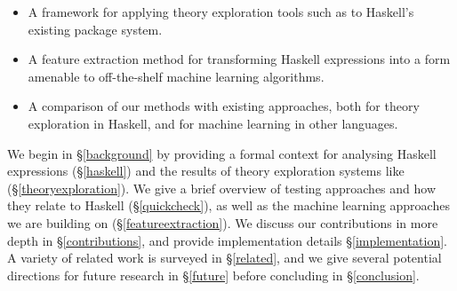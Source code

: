 \begin{itemize}
  \item A framework for applying theory exploration tools such as \qspec{} to Haskell's existing package system.
  \item A feature extraction method for transforming Haskell expressions into a form amenable to off-the-shelf machine learning algorithms.
  \item A comparison of our methods with existing approaches, both for theory exploration in Haskell, and for machine learning in other languages.
\end{itemize}

We begin in \S \ref{background} by providing a formal context for analysing Haskell expressions (\S \ref{haskell}) and the results of theory exploration systems like \qspec{} (\S \ref{theoryexploration}). We give a brief overview of testing approaches and how they relate to Haskell (\S \ref{quickcheck}), as well as the machine learning approaches we are building on (\S \ref{featureextraction}). We discuss our contributions in more depth in \S \ref{contributions}, and provide implementation details \S \ref{implementation}. A variety of related work is surveyed in \S \ref{related}, and we give several potential directions for future research in \S \ref{future} before concluding in \S \ref{conclusion}.
